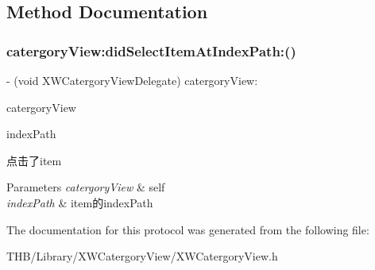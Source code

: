 \subsection{Method Documentation}
\mbox{\label{protocol_x_w_catergory_view_delegate_01-p_a51d66b3a7e2330532b7a82aa4aa283dd}} 
\subsubsection{\texorpdfstring{catergory\+View\+:did\+Select\+Item\+At\+Index\+Path\+:()}{catergoryView:didSelectItemAtIndexPath:()}}
{\footnotesize\ttfamily -\/ (void X\+W\+Catergory\+View\+Delegate) catergory\+View\+: \begin{DoxyParamCaption}\item[{(\mbox{\hyperlink{interface_x_w_catergory_view}{X\+W\+Catergory\+View}} $\ast$)}]{catergory\+View }\item[{didSelectItemAtIndexPath:(N\+S\+Index\+Path $\ast$)}]{index\+Path }\end{DoxyParamCaption}\hspace{0.3cm}{\ttfamily [optional]}}

点击了item


\begin{DoxyParams}{Parameters}
{\em catergory\+View} & self \\
\hline
{\em index\+Path} & item的index\+Path \\
\hline
\end{DoxyParams}


The documentation for this protocol was generated from the following file\+:\begin{DoxyCompactItemize}
\item 
T\+H\+B/\+Library/\+X\+W\+Catergory\+View/X\+W\+Catergory\+View.\+h\end{DoxyCompactItemize}
